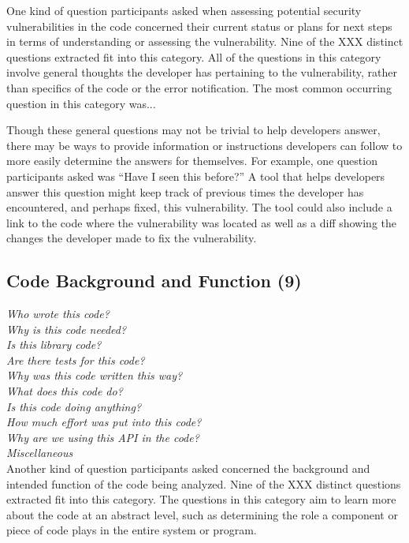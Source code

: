 \documentclass[conference]{IEEEtran}
\begin{document}
One kind of question participants asked when assessing potential security vulnerabilities in the code concerned their current status or plans for next steps in terms of understanding or assessing the vulnerability. Nine of the XXX distinct questions extracted fit into this category. All of the questions in this category involve general thoughts the developer has pertaining to the vulnerability, rather than specifics of the code or the error notification.  The most common occurring question in this category was...

Though these general questions may not be trivial to help developers answer, there may be ways to provide information or instructions developers can follow to more easily determine the answers for themselves. For example, one question participants asked was ``Have I seen this before?'' A tool that helps developers answer this question might keep track of previous times the developer has encountered, and perhaps fixed, this vulnerability. The tool could also include a link to the code where the vulnerability was located as well as a diff showing the changes the developer made to fix the vulnerability.


\noindent\subsection{\textbf{Code Background and Function (9)}}

\noindent\emph{Who wrote this code?} \\
\emph{Why is this code needed?} \\
\emph{Is this library code?} \\
\emph{Are there tests for this code?} \\
\emph{Why was this code written this way?} \\
\emph{What does this code do?} \\
\emph{Is this code doing anything?} \\
\emph{How much effort was put into this code?} \\
\emph{Why are we using this API in the code?} \\
\emph{Miscellaneous} \\

Another kind of question participants asked concerned the background and intended function of the code being analyzed. Nine of the XXX distinct questions extracted fit into this category. The questions in this category aim to learn more about the code at an abstract level, such as determining the role a component or piece of code plays in the entire system or program.
\end{document}
